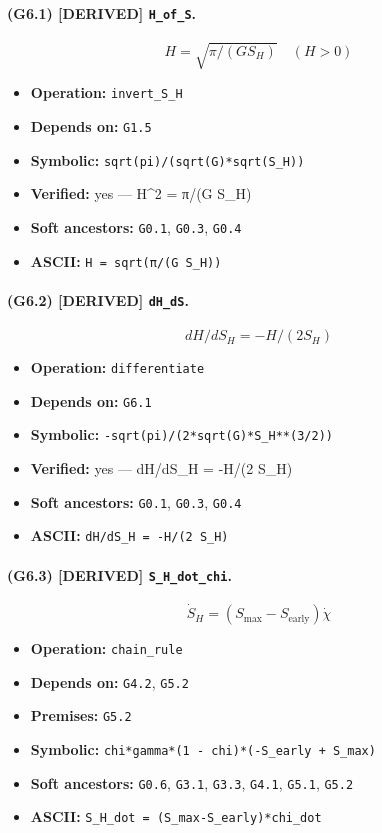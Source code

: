 \documentclass[11pt,a4paper]{article}
\theoremstyle{remark}\newtheorem*{caution}{Caution}
\newcommand{\tagbox}[1]{\textsc{[#1]}}
\begin{document}
\paragraph{(G6.1) \tagbox{DERIVED} \texttt{H\_of\_S}.}
\begin{equation}
H=\sqrt{\pi/(G S_H)}\quad(H>0)
\tag{G6.1}
\end{equation}
\begin{itemize}\setlength{\itemsep}{0.12em}
\item \textbf{Operation:} \texttt{invert\_S\_H}
\item \textbf{Depends on:} \texttt{G1.5}
\item \textbf{Symbolic:} \texttt{sqrt(pi)/(sqrt(G)*sqrt(S\_H))}
\item \textbf{Verified:} yes --- H^2 = π/(G S\_H)
\item \textbf{Soft ancestors:} \texttt{G0.1}, \texttt{G0.3}, \texttt{G0.4}
\item \textbf{ASCII:} \texttt{H = sqrt(π/(G S\_H))}
\end{itemize}
\paragraph{(G6.2) \tagbox{DERIVED} \texttt{dH\_dS}.}
\begin{equation}
dH/dS_H=-H/(2 S_H)
\tag{G6.2}
\end{equation}
\begin{itemize}\setlength{\itemsep}{0.12em}
\item \textbf{Operation:} \texttt{differentiate}
\item \textbf{Depends on:} \texttt{G6.1}
\item \textbf{Symbolic:} \texttt{-sqrt(pi)/(2*sqrt(G)*S\_H**(3/2))}
\item \textbf{Verified:} yes --- dH/dS\_H = -H/(2 S\_H)
\item \textbf{Soft ancestors:} \texttt{G0.1}, \texttt{G0.3}, \texttt{G0.4}
\item \textbf{ASCII:} \texttt{dH/dS\_H = -H/(2 S\_H)}
\end{itemize}
\paragraph{(G6.3) \tagbox{DERIVED} \texttt{S\_H\_dot\_chi}.}
\begin{equation}
\dot S_H=(S_{\max}-S_{\mathrm{early}})\dot\chi
\tag{G6.3}
\end{equation}
\begin{itemize}\setlength{\itemsep}{0.12em}
\item \textbf{Operation:} \texttt{chain\_rule}
\item \textbf{Depends on:} \texttt{G4.2}, \texttt{G5.2}
\item \textbf{Premises:} \texttt{G5.2}
\item \textbf{Symbolic:} \texttt{chi*gamma*(1 - chi)*(-S\_early + S\_max)}
\item \textbf{Soft ancestors:} \texttt{G0.6}, \texttt{G3.1}, \texttt{G3.3}, \texttt{G4.1}, \texttt{G5.1}, \texttt{G5.2}
\item \textbf{ASCII:} \texttt{S\_H\_dot = (S\_max-S\_early)*chi\_dot}
\end{itemize}
\end{document}
